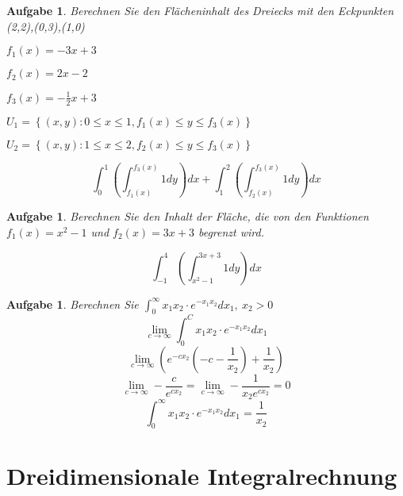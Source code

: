 \documentclass[12pt,a4paper]{scrreprt}
\newtheorem{aufg}[defi]{Aufgabe}
\begin{document}
	\begin{aufg}
		Berechnen Sie den Flächeninhalt des Dreiecks mit den Eckpunkten (2,2),(0,3),(1,0)


		$f_1(x) = -3x+3$

		$f_2(x) = 2x-2$

		$f_3(x) = -\frac{1}{2}x+3$

		$U_1=\left\{(x,y): 0 \le x \le 1, f_1(x) \le y \le f_3(x) \right\}$

		$U_2=\left\{(x,y): 1 \le x \le 2, f_2(x) \le y \le f_3(x) \right\}$

		$$\int_0^1\left(\int_{f_1(x)}^{f_3(x)} 1dy\right)dx + \int_1^2\left(\int_{f_2(x)}^{f_3(x)} 1dy\right)dx$$
	\end{aufg}

	\begin{aufg}
		Berechnen Sie den Inhalt der Fläche, die von den Funktionen $f_1(x)=x^2-1$ und $f_2(x)=3x+3$ begrenzt wird.
		\\

		$$\int_{-1}^4 \left(\int_{x^2-1}^{3x+3} 1dy\right)dx$$
	\end{aufg}

	\begin{aufg}
		Berechnen Sie $\int_0^\infty x_1 x_2 \cdot e^{-x_1 x_2}dx_1,\ x_2>0$
		\[\lim_{c\to\infty} \int_0^C x_1 x_2 \cdot e^{-x_1 x_2}dx_1\]
		\[\lim_{c\to\infty} \left(e^{-cx_2}\left(-c-\frac{1}{x_2}\right)+\frac{1}{x_2} \right)\]
		\[\lim_{c\to\infty} -\frac{c}{e^{cx_2}}=\lim_{c\to\infty} -\frac{1}{x_2e^{cx_2}}=0 \]
		\[\int_0^\infty x_1 x_2 \cdot e^{-x_1 x_2}dx_1=\frac{1}{x_2}\]
	\end{aufg}

	\section{Dreidimensionale Integralrechnung}
\end{document}
